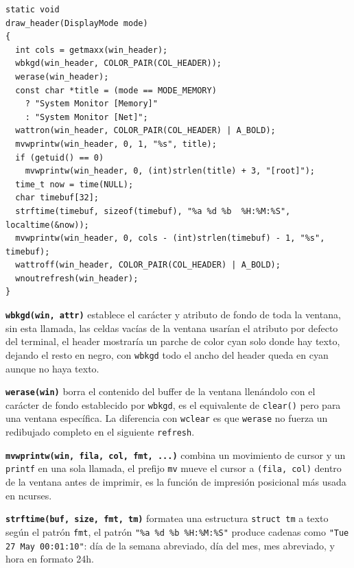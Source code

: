 \documentclass[12pt,letterpaper]{article}
\begin{document}
\begin{lstlisting}[style=modernc, caption={\texttt{ui.c} draw\_header()}]
static void
draw_header(DisplayMode mode)
{
  int cols = getmaxx(win_header);
  wbkgd(win_header, COLOR_PAIR(COL_HEADER));
  werase(win_header);
  const char *title = (mode == MODE_MEMORY)
    ? "System Monitor [Memory]"
    : "System Monitor [Net]";
  wattron(win_header, COLOR_PAIR(COL_HEADER) | A_BOLD);
  mvwprintw(win_header, 0, 1, "%s", title);
  if (getuid() == 0)
    mvwprintw(win_header, 0, (int)strlen(title) + 3, "[root]");
  time_t now = time(NULL);
  char timebuf[32];
  strftime(timebuf, sizeof(timebuf), "%a %d %b  %H:%M:%S", localtime(&now));
  mvwprintw(win_header, 0, cols - (int)strlen(timebuf) - 1, "%s", timebuf);
  wattroff(win_header, COLOR_PAIR(COL_HEADER) | A_BOLD);
  wnoutrefresh(win_header);
}
\end{lstlisting}

\textbf{\texttt{wbkgd(win, attr)}} establece el carácter y atributo de fondo de toda la ventana, sin esta
llamada, las celdas vacías de la ventana usarían el atributo por defecto del terminal, el header mostraría un
parche de color cyan solo donde hay texto, dejando el resto en negro, con \texttt{wbkgd} todo el
ancho del header queda en cyan aunque no haya texto.

\medskip

\textbf{\texttt{werase(win)}} borra el contenido del buffer de la ventana llenándolo con el carácter de fondo
establecido por \texttt{wbkgd}, es el equivalente de \texttt{clear()} pero para una ventana específica.
La diferencia con \texttt{wclear} es que \texttt{werase} no fuerza un redibujado completo en
el siguiente \texttt{refresh}.

\medskip

\textbf{\texttt{mvwprintw(win, fila, col, fmt, ...)}} combina un movimiento de cursor y un \texttt{printf} en
una sola llamada, el prefijo \texttt{mv} mueve el cursor a \texttt{(fila, col)} dentro de la ventana antes de
imprimir, es la función de impresión posicional más usada en ncurses.

\medskip

\textbf{\texttt{strftime(buf, size, fmt, tm)}} formatea una estructura \texttt{struct tm} a texto según el
patrón \texttt{fmt}, el patrón \texttt{"\%a \%d \%b  \%H:\%M:\%S"} produce cadenas como
\texttt{"Tue 27 May  00:01:10"}: día de la semana abreviado, día del mes, mes abreviado, y hora en formato 24h.

\medskip
\end{document}
